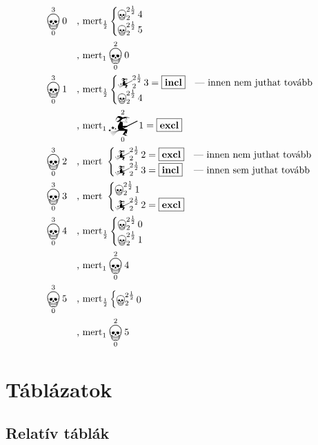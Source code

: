 \documentclass{article}
\newcommand{\just}[1]{\boxed{#1}}%
\newcommand{\incl}{\mathbf{incl}}
\newcommand{\excl}{\mathbf{excl}}
\newcommand{\mainfun}[3]{\mathwitch_{#1}^{#2}#3}
\newcommand{\nomainfun}[3]{\bigskull_{#1}^{#2}#3}
\begin{document}
	\begin{align*}
		&\nomainfun030   &&\text{, mert}_\frac12\begin{cases}\nomainfun2{2\frac12}4\\\nomainfun2{2\frac12}5\end{cases}\\
		&                &&\text{, mert}_1\nomainfun020\\
		&\nomainfun031   &&\text{, mert}_\frac12\begin{cases}\mainfun2{2\frac12}3 = \just\incl&\text{--- innen nem juthat tovább}\\\nomainfun2{2\frac12}4\end{cases}\\
		&                &&\text{, mert}_1\mainfun021 = \just\excl\\
		&\nomainfun032   &&\text{, mert }\begin{cases}\mainfun2{2\frac12}2 = \just\excl&\text{--- innen nem juthat tovább}\\\mainfun2{2\frac12}3 = \just\incl&\text{--- innen sem juthat tovább}\end{cases}\\
		&\nomainfun033   &&\text{, mert }\begin{cases}\nomainfun2{2\frac12}1\\\mainfun2{2\frac12}2 = \just\excl&\end{cases}\\
		&\nomainfun034   &&\text{, mert}_\frac12\begin{cases}\nomainfun2{2\frac12}0\\\nomainfun2{2\frac12}1\end{cases}\\
		&                &&\text{, mert}_1\nomainfun024\\
		&\nomainfun035   &&\text{, mert}_\frac12\begin{cases}\nomainfun2{2\frac12}0\end{cases}\\
		&                &&\text{, mert}_1\nomainfun025
	\end{align*}

	\section{Táblázatok}

	\subsection{Relatív táblák}
\end{document}
